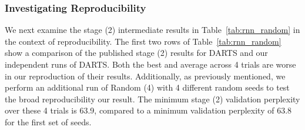 \documentclass[acmlarge, nonacm]{acmart}
\begin{document}
\subsubsection{Investigating Reproducibility}
\label{ssec:rnn_reproduce}
\begin{table}[]
    \centering
    \caption{\textbf{PTB Benchmark: Ranking of Intermediate Validation Perplexity.}  Architectures are retrained from scratch using the proxyless network and the validation perplexity is reported after training for the indicated number of epochs.  The final test perplexity after training for 3600 epochs is also shown for reference.}
    
    \label{tab:rnn_reproduce}
\end{table}

We next examine the  stage (2) intermediate results in Table~\ref{tab:rnn_random} in the context of reproducibility. 
The first two rows of Table~\ref{tab:rnn_random} show a comparison of the published stage (2) results for DARTS and our independent runs of DARTS. 
Both the best and average across 4 trials are worse in our reproduction of their results. 
Additionally, as previously mentioned, we perform an additional run of Random (4) with 4 different random seeds to test the broad reproducibility our result. The minimum stage (2) validation perplexity over these 4 trials 
is 63.9, compared to a minimum validation perplexity of 63.8 for the first set of seeds.  
\end{document}
